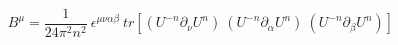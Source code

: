 \begin{equation}
B^\mu= \frac{1}{24\pi^2 n^2}~\epsilon^{\mu\nu\alpha\beta}~tr[ (U^{-n} \partial_\nu U^n)~( U^{-n} \partial_\alpha U^n)~
(U^{-n} \partial_\beta U^n) ]
\end{equation}

